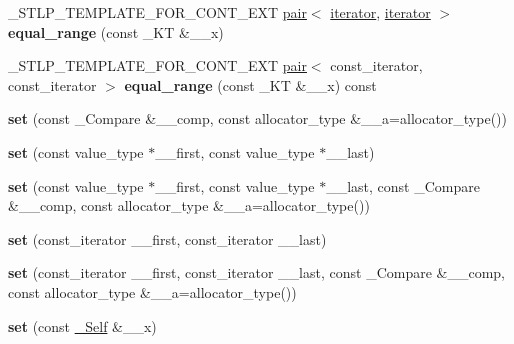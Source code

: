 \begin{DoxyCompactItemize}
\item 
\mbox{\label{classset_a63fbeadadc1edd7ff9fc68757bf8569e}} 
\+\_\+\+S\+T\+L\+P\+\_\+\+T\+E\+M\+P\+L\+A\+T\+E\+\_\+\+F\+O\+R\+\_\+\+C\+O\+N\+T\+\_\+\+E\+XT \hyperlink{structpair}{pair}$<$ \hyperlink{structiterator}{iterator}, \hyperlink{structiterator}{iterator} $>$ {\bfseries equal\+\_\+range} (const \+\_\+\+KT \&\+\_\+\+\_\+x)
\item 
\mbox{\label{classset_a1aee49950b07f6ca41c15621d9733352}} 
\+\_\+\+S\+T\+L\+P\+\_\+\+T\+E\+M\+P\+L\+A\+T\+E\+\_\+\+F\+O\+R\+\_\+\+C\+O\+N\+T\+\_\+\+E\+XT \hyperlink{structpair}{pair}$<$ const\+\_\+iterator, const\+\_\+iterator $>$ {\bfseries equal\+\_\+range} (const \+\_\+\+KT \&\+\_\+\+\_\+x) const
\item 
\mbox{\label{classset_a8a6d021a0c8548d2d0730c7e39410ac5}} 
{\bfseries set} (const \+\_\+\+Compare \&\+\_\+\+\_\+comp, const allocator\+\_\+type \&\+\_\+\+\_\+a=allocator\+\_\+type())
\item 
\mbox{\label{classset_af177b637cb37a03ff2de6179dc778765}} 
{\bfseries set} (const value\+\_\+type $\ast$\+\_\+\+\_\+first, const value\+\_\+type $\ast$\+\_\+\+\_\+last)
\item 
\mbox{\label{classset_a04ee8d0f65ed237bb285d58b0679d50f}} 
{\bfseries set} (const value\+\_\+type $\ast$\+\_\+\+\_\+first, const value\+\_\+type $\ast$\+\_\+\+\_\+last, const \+\_\+\+Compare \&\+\_\+\+\_\+comp, const allocator\+\_\+type \&\+\_\+\+\_\+a=allocator\+\_\+type())
\item 
\mbox{\label{classset_a0e21bc86229a83e89ef09fc009436a6b}} 
{\bfseries set} (const\+\_\+iterator \+\_\+\+\_\+first, const\+\_\+iterator \+\_\+\+\_\+last)
\item 
\mbox{\label{classset_a992b020f3a764655b8437125877d1213}} 
{\bfseries set} (const\+\_\+iterator \+\_\+\+\_\+first, const\+\_\+iterator \+\_\+\+\_\+last, const \+\_\+\+Compare \&\+\_\+\+\_\+comp, const allocator\+\_\+type \&\+\_\+\+\_\+a=allocator\+\_\+type())
\item 
\mbox{\label{classset_a4b70580b96fef9ddca0119cfad2ef2b3}} 
{\bfseries set} (const \hyperlink{classset}{\+\_\+\+Self} \&\+\_\+\+\_\+x)

\end{DoxyCompactItemize}
